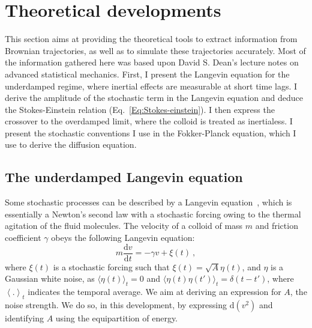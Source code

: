 \section{Theoretical developments}
\label{sec:Theoretical_developments}
This section aims at providing the theoretical tools to extract information from Brownian trajectories, as well as to simulate these trajectories accurately. Most of the information gathered here was based upon David S. Dean's lecture notes on advanced statistical mechanics. First, I present the Langevin equation for the underdamped regime, where inertial effects are measurable at short time lags. I derive the amplitude of the stochastic term in the Langevin equation and deduce the Stokes-Einstein relation (Eq.~\ref{Eq:Stokes-einstein}). I then express the crossover to the overdamped limit, where the colloid is treated as inertialess. I present the stochastic conventions I use in the Fokker-Planck equation, which I use to derive the diffusion equation. 


\subsection{The underdamped Langevin equation}
\label{subsec:UDLangevin}
Some stochastic processes can be described by a Langevin equation~\cite{Langevin1908Brownian}, which is essentially a Newton's second law with a stochastic forcing owing to the thermal agitation of the fluid molecules. The velocity of a colloid of mass $m$ and friction coefficient $\gamma$ obeys the following Langevin equation: 
\begin{equation}
    m \dfrac{\mathrm{d}v}{\mathrm{d}t} = - \gamma v + \xi (t)~,
    \label{Eq:UDlangevin}
\end{equation}
where $\xi(t)$ is a stochastic forcing such that $\xi(t)=\sqrt{A} \eta(t)$, and $\eta$ is a Gaussian white noise, as $\langle \eta(t) \rangle_t = 0$ and $\langle \eta(t)\eta(t')\rangle_t = \delta(t-t')$, where $\left\langle . \right\rangle_t$ indicates the temporal average. We aim at deriving an expression for $A$, the noise strength. We do so, in this development, by expressing $\mathrm{d}(v^2)$ and identifying $A$ using the equipartition of energy. 

